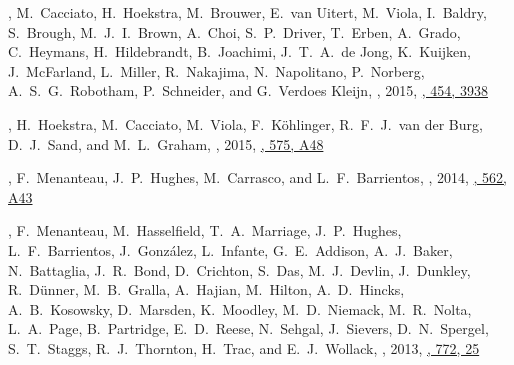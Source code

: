 \item
\myself, M.~Cacciato, H.~Hoekstra, M.~Brouwer, E.~van Uitert, M.~Viola, I.~Baldry, S.~Brough, M.~J.~I.~Brown, A.~Choi, S.~P.~Driver, T.~Erben, A.~Grado, C.~Heymans, H.~Hildebrandt, B.~Joachimi, J.~T.~A.~de Jong, K.~Kuijken, J.~McFarland, L.~Miller, R.~Nakajima, N.~Napolitano, P.~Norberg, A.~S.~G.~Robotham, P.~Schneider, and G.~Verdoes Kleijn,
,
2015, \href{https://ui.adsabs.harvard.edu/abs/2015MNRAS.454.3938S}{\mnras, 454, 3938}

\item
\myself, H.~Hoekstra, M.~Cacciato, M.~Viola, F.~Köhlinger, R.~F.~J.~van der Burg, D.~J.~Sand, and M.~L.~Graham,
,
2015, \href{https://ui.adsabs.harvard.edu/abs/2015A&A...575A..48S}{\aap, 575, A48}

\item
\myself, F.~Menanteau, J.~P.~Hughes, M.~Carrasco, and L.~F.~Barrientos,
,
2014, \href{https://ui.adsabs.harvard.edu/abs/2014A&A...562A..43S}{\aap, 562, A43}

\item
\myself, F.~Menanteau, M.~Hasselfield, T.~A.~Marriage, J.~P.~Hughes, L.~F.~Barrientos, J.~González, L.~Infante, G.~E.~Addison, A.~J.~Baker, N.~Battaglia, J.~R.~Bond, D.~Crichton, S.~Das, M.~J.~Devlin, J.~Dunkley, R.~Dünner, M.~B.~Gralla, A.~Hajian, M.~Hilton, A.~D.~Hincks, A.~B.~Kosowsky, D.~Marsden, K.~Moodley, M.~D.~Niemack, M.~R.~Nolta, L.~A.~Page, B.~Partridge, E.~D.~Reese, N.~Sehgal, J.~Sievers, D.~N.~Spergel, S.~T.~Staggs, R.~J.~Thornton, H.~Trac, and E.~J.~Wollack,
,
2013, \href{https://ui.adsabs.harvard.edu/abs/2013ApJ...772...25S}{\apj, 772, 25}

